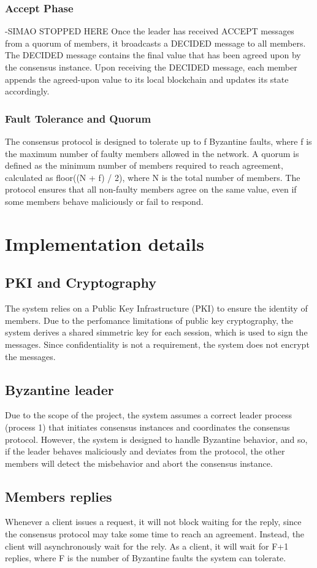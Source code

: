 \documentclass[runningheads]{llncs}
\begin{document}
\subsubsection{Accept Phase}
-SIMAO STOPPED HERE
Once the leader has received ACCEPT messages from a quorum of members, it
broadcasts a DECIDED message to all members. The DECIDED message contains the
final value that has been agreed upon by the consensus instance. Upon receiving
the DECIDED message, each member appends the agreed-upon value to its local
blockchain and updates its state accordingly.
\subsubsection{Fault Tolerance and Quorum}
The consensus protocol is designed to tolerate up to f Byzantine faults, where f
is the maximum number of faulty members allowed in the network. A quorum is
defined as the minimum number of members required to reach agreement, calculated
as floor((N + f) / 2), where N is the total number of members. The protocol
ensures that all non-faulty members agree on the same value, even if some
members behave maliciously or fail to respond.

%
\section{Implementation details}
\subsection{PKI and Cryptography}
The system relies on a Public Key Infrastructure (PKI) to ensure the identity of
members. Due to the perfomance limitations of public key cryptography, the
system derives a shared simmetric key for each session, which is used to sign
the messages. Since confidentiality is not a requirement, the system does not
encrypt the messages.
%
\subsection{Byzantine leader}
Due to the scope of the project, the system assumes a correct leader process
(process 1) that initiates consensus instances and coordinates the consensus
protocol. However, the system is designed to handle Byzantine behavior, and so,
if the leader behaves maliciously and deviates from the protocol, the other
members will detect the misbehavior and abort the consensus instance.
%
\subsection{Members replies}
Whenever a client issues a request, it will not block waiting for the reply,
since the consensus protocol may take some time to reach an agreement. Instead,
the client will asynchronously wait for the rely. As a client, it will wait for 
F+1 replies, where F is the number of Byzantine faults the system can tolerate.
%
\end{document}
